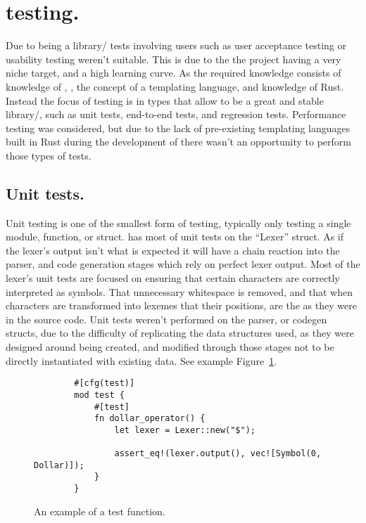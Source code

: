 \section{\languageName{} testing.}
Due to being a library/\compiler{} tests involving users such as user acceptance testing or usability testing weren't suitable. This is due to the the project having a very niche target, and a high learning curve. As the required knowledge consists of knowledge of , , the concept of a templating language, and knowledge of Rust. Instead the focus of testing is in types that allow \languageName{} to be a great and stable library/\compiler{}, such as unit tests, end-to-end tests, and regression tests. Performance testing was considered, but due to the lack of pre-existing templating languages built in Rust during the development of \languageName{} there wasn't an opportunity to perform those types of tests.
\subsection{Unit tests.}
Unit testing is one of the smallest form of testing, typically only testing a single module, function, or struct. \languageName{} has most of unit tests on the ``Lexer'' struct. As if the lexer's output isn't what is expected it will have a chain reaction into the parser, and code generation stages which rely on perfect lexer output. Most of the lexer's unit tests are focused on ensuring that certain characters are correctly interpreted as symbols. That unnecessary whitespace is removed, and that when characters are transformed into lexemes that their positions, are the as they were in the source code. Unit tests weren't performed on the parser, or codegen structs, due to the difficulty of replicating the data structures used, as they were designed around being created, and modified through those stages not to be directly instantiated with existing data. See example Figure~\ref{fig:exampleTest}.

\begin{figure}[!hbtp]
    \begin{verbatim}
        #[cfg(test)]
        mod test {
            #[test]
            fn dollar_operator() {
                let lexer = Lexer::new("$");

                assert_eq!(lexer.output(), vec![Symbol(0, Dollar)]);
            }
        }
    \end{verbatim}
    \caption{An example of a test function.}
    \label{fig:exampleTest}
\end{figure}

